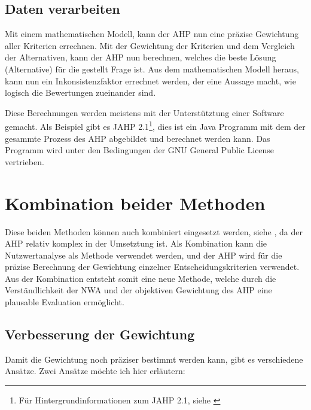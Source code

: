   \subsection{Daten verarbeiten}
  
  Mit einem mathematischen Modell, kann der \ac{AHP} nun eine präzise Gewichtung
  aller Kriterien errechnen. Mit der Gewichtung der Kriterien und dem Vergleich
  der Alternativen, kann der \ac{AHP} nun berechnen, welches die beste Lösung
  (Alternative) für die gestellt Frage ist. Aus dem mathematischen Modell
  heraus, kann nun ein Inkonsistenzfaktor errechnet werden, der eine Aussage
  macht, wie logisch die Bewertungen zueinander sind.
  
  Diese Berechnungen werden meistens mit der Unterstütztung einer Software
  gemacht. Als Beispiel gibt es JAHP 2.1\footnote{Für Hintergrundinformationen
  zum JAHP 2.1, siehe \cite{JAHP}}, dies ist ein Java Programm mit dem der
  gesammte Prozess des \ac{AHP} abgebildet und berechnet werden kann. Das
  Programm wird unter den Bedingungen der GNU General Public License
  vertrieben.
    
  \section{Kombination beider Methoden}
  
  Diese beiden Methoden können auch kombiniert eingesetzt werden, siehe
  \cite{AhpNwaKombination}, da der \ac{AHP} relativ komplex in der Umsetztung
  ist. Als Kombination kann die Nutzwertanalyse als Methode verwendet werden,
  und der \ac{AHP} wird für die präzise Berechnung der Gewichtung einzelner
  Entscheidungskriterien verwendet. Aus der Kombination entsteht somit eine
  neue Methode, welche durch die Verständlichkeit der \ac{NWA} und der
  objektiven Gewichtung des \ac{AHP} eine plausable Evaluation ermöglicht.

  \subsection{Verbesserung der 
  Gewichtung}\label{subsection:VerbesserungDerGewichtung}
  
  Damit die Gewichtung noch präziser bestimmt werden kann, gibt es verschiedene
  Ansätze. Zwei Ansätze möchte ich hier erläutern:
  
